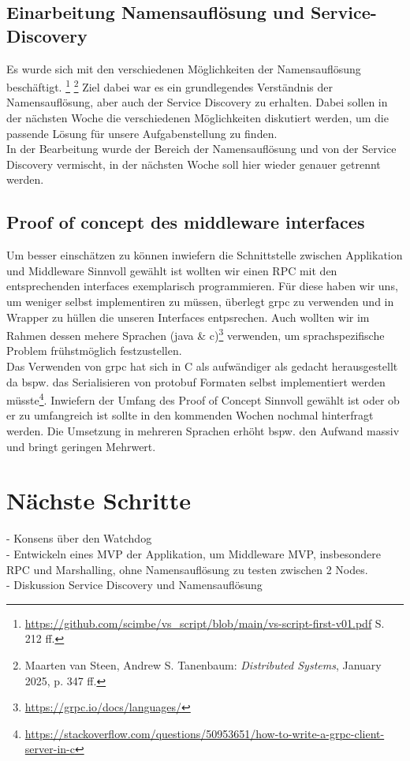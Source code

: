 \documentclass{article}
\begin{document}
\subsection{Einarbeitung Namensauflösung und Service-Discovery}
Es wurde sich mit den verschiedenen Möglichkeiten der Namensauflösung beschäftigt. \footnote{\url{https://github.com/scimbe/vs_script/blob/main/vs-script-first-v01.pdf} S. 212 ff.} \footnote{Maarten van Steen, Andrew S. Tanenbaum: \textit{Distributed Systems}, January 2025, p. 347 ff.}
Ziel dabei war es ein grundlegendes Verständnis der Namensauflösung, aber auch der Service Discovery zu erhalten.
Dabei sollen in der nächsten Woche die verschiedenen Möglichkeiten diskutiert werden, um die passende Lösung für unsere Aufgabenstellung zu finden.
\\
In der Bearbeitung wurde der Bereich der Namensauflösung und von der Service Discovery vermischt, in der nächsten Woche soll hier wieder genauer getrennt werden.

\subsection{Proof of concept des middleware interfaces}
Um besser einschätzen zu können inwiefern die Schnittstelle zwischen Applikation und Middleware Sinnvoll gewählt ist wollten wir einen RPC mit den entsprechenden interfaces exemplarisch programmieren.
Für diese haben wir uns, um weniger selbst implementiren zu müssen, überlegt grpc zu verwenden und in Wrapper zu hüllen die unseren Interfaces entpsrechen.
Auch wollten wir im Rahmen dessen mehere Sprachen (java \& c)\footnote{\url{https://grpc.io/docs/languages/}} verwenden, um sprachspezifische Problem frühstmöglich festzustellen. 
\\
Das Verwenden von grpc hat sich in C als aufwändiger als gedacht herausgestellt da bspw. das Serialisieren von protobuf Formaten selbst implementiert werden müsste\footnote{\url{https://stackoverflow.com/questions/50953651/how-to-write-a-grpc-client-server-in-c}}. 
Inwiefern der Umfang des Proof of Concept Sinnvoll gewählt ist
oder ob er zu umfangreich ist sollte in den kommenden Wochen nochmal hinterfragt werden. Die Umsetzung in mehreren Sprachen erhöht bspw. den Aufwand massiv und bringt geringen Mehrwert.

\section{Nächste Schritte}
- Konsens über den Watchdog \\
- Entwickeln eines MVP der Applikation, um Middleware MVP, insbesondere RPC und Marshalling, ohne Namensauflösung zu testen zwischen 2 Nodes.\\
- Diskussion Service Discovery und Namensauflösung
\end{document}
